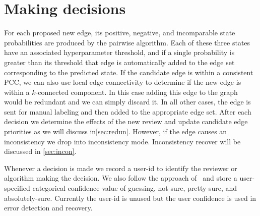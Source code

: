 \section{Making decisions}\label{sec:decision}

For each proposed new edge, its positive, negative, and incomparable state probabilities are produced by the
pairwise algorithm. Each of these three states have an associated hyperparameter threshold, and if a single
probability is greater than its threshold that edge is automatically added to the edge set corresponding to the
predicted state. If the candidate edge is within a consistent PCC, we can also use local edge connectivity to
determine if the new edge is within a $k$-connected component. In this case adding this edge to the graph would be
redundant and we can simply discard it. In all other cases, the edge is sent for manual labeling and then added to
the appropriate edge set. After each decision we determine the effects of the new review and update candidate edge
priorities as we will discuss in\cref{sec:redun}. However, if the edge causes an inconsistency we drop into
inconsistency mode. Inconsistency recover will be discussed in \cref{sec:incon}.

Whenever a decision is made we record a user-id to identify the reviewer or algorithm making the decision. We also
follow the approach of~\cite{branson_visual_2010} and store a user-specified categorical confidence value of
guessing, not-sure, pretty-sure, and absolutely-sure. Currently the user-id is unused but the user confidence is
used in error detection and recovery.








